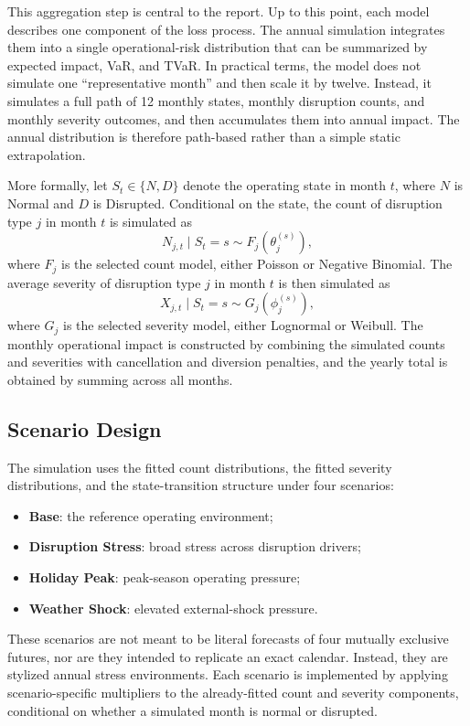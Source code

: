 \documentclass[11pt]{article}
\begin{document}
This aggregation step is central to the report. Up to this point, each model describes one component of the loss process. The annual simulation integrates them into a single operational-risk distribution that can be summarized by expected impact, VaR, and TVaR. In practical terms, the model does not simulate one ``representative month'' and then scale it by twelve. Instead, it simulates a full path of 12 monthly states, monthly disruption counts, and monthly severity outcomes, and then accumulates them into annual impact. The annual distribution is therefore path-based rather than a simple static extrapolation.

More formally, let \(S_t \in \{N,D\}\) denote the operating state in month \(t\), where \(N\) is Normal and \(D\) is Disrupted. Conditional on the state, the count of disruption type \(j\) in month \(t\) is simulated as
\[
N_{j,t}\mid S_t=s \sim F_j\!\left(\theta_j^{(s)}\right),
\]
where \(F_j\) is the selected count model, either Poisson or Negative Binomial. The average severity of disruption type \(j\) in month \(t\) is then simulated as
\[
X_{j,t}\mid S_t=s \sim G_j\!\left(\phi_j^{(s)}\right),
\]
where \(G_j\) is the selected severity model, either Lognormal or Weibull. The monthly operational impact is constructed by combining the simulated counts and severities with cancellation and diversion penalties, and the yearly total is obtained by summing across all months.

\subsection{Scenario Design}
The simulation uses the fitted count distributions, the fitted severity distributions, and the state-transition structure under four scenarios:
\begin{itemize}
  \item \textbf{Base}: the reference operating environment;
  \item \textbf{Disruption Stress}: broad stress across disruption drivers;
  \item \textbf{Holiday Peak}: peak-season operating pressure;
  \item \textbf{Weather Shock}: elevated external-shock pressure.
\end{itemize}

These scenarios are not meant to be literal forecasts of four mutually exclusive futures, nor are they intended to replicate an exact calendar. Instead, they are stylized annual stress environments. Each scenario is implemented by applying scenario-specific multipliers to the already-fitted count and severity components, conditional on whether a simulated month is normal or disrupted.
\end{document}
